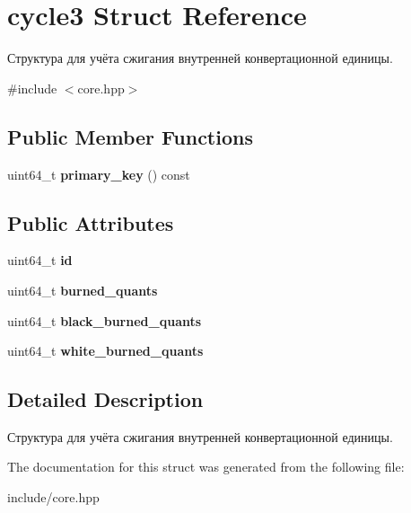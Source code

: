 \hypertarget{structcycle3}{}\section{cycle3 Struct Reference}
\label{structcycle3}


Структура для учёта сжигания внутренней конвертационной единицы.  




{\ttfamily \#include $<$core.\+hpp$>$}

\subsection*{Public Member Functions}
\begin{DoxyCompactItemize}
\item 
\mbox{\label{structcycle3_a004564991f58638fb60be5a624f69496}} 
uint64\+\_\+t {\bfseries primary\+\_\+key} () const
\end{DoxyCompactItemize}
\subsection*{Public Attributes}
\begin{DoxyCompactItemize}
\item 
\mbox{\label{structcycle3_a3cf542d190bd8cd0fbf14940da5842e4}} 
uint64\+\_\+t {\bfseries id}
\item 
\mbox{\label{structcycle3_a392a76c646ae64580bbfec515c7d9448}} 
uint64\+\_\+t {\bfseries burned\+\_\+quants}
\item 
\mbox{\label{structcycle3_a6a62a7509628dbddfebe013acdf253b8}} 
uint64\+\_\+t {\bfseries black\+\_\+burned\+\_\+quants}
\item 
\mbox{\label{structcycle3_a06fdfa87b0e7088a600ac84eb55c3171}} 
uint64\+\_\+t {\bfseries white\+\_\+burned\+\_\+quants}
\end{DoxyCompactItemize}


\subsection{Detailed Description}
Структура для учёта сжигания внутренней конвертационной единицы. 

The documentation for this struct was generated from the following file\+:\begin{DoxyCompactItemize}
\item 
include/core.\+hpp\end{DoxyCompactItemize}
